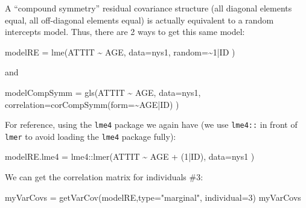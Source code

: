 \documentclass[
  letterpaper,
  DIV=11,
  numbers=noendperiod]{scrreprt}
\newenvironment{Shaded}{}{}
\newcommand{\AttributeTok}[1]{\textcolor[rgb]{0.49,0.56,0.16}{#1}}
\newcommand{\DecValTok}[1]{\textcolor[rgb]{0.25,0.63,0.44}{#1}}
\newcommand{\FunctionTok}[1]{\textcolor[rgb]{0.02,0.16,0.49}{#1}}
\newcommand{\NormalTok}[1]{#1}
\newcommand{\OtherTok}[1]{\textcolor[rgb]{0.00,0.44,0.13}{#1}}
\newcommand{\SpecialCharTok}[1]{\textcolor[rgb]{0.25,0.44,0.63}{#1}}
\newcommand{\StringTok}[1]{\textcolor[rgb]{0.25,0.44,0.63}{#1}}
\begin{document}
A ``compound symmetry'' residual covariance structure (all diagonal
elements equal, all off-diagonal elements equal) is actually equivalent
to a random intercepts model. Thus, there are 2 ways to get this same
model:

\begin{Shaded}
\begin{Highlighting}[]
\NormalTok{modelRE }\OtherTok{=} \FunctionTok{lme}\NormalTok{(ATTIT }\SpecialCharTok{\textasciitilde{}}\NormalTok{ AGE, }
              \AttributeTok{data=}\NormalTok{nys1,}
              \AttributeTok{random=}\SpecialCharTok{\textasciitilde{}}\DecValTok{1}\SpecialCharTok{|}\NormalTok{ID )}
\end{Highlighting}
\end{Shaded}

and

\begin{Shaded}
\begin{Highlighting}[]
\NormalTok{modelCompSymm }\OtherTok{=} \FunctionTok{gls}\NormalTok{(ATTIT }\SpecialCharTok{\textasciitilde{}}\NormalTok{ AGE,}
                    \AttributeTok{data=}\NormalTok{nys1,}
                    \AttributeTok{correlation=}\FunctionTok{corCompSymm}\NormalTok{(}\AttributeTok{form=}\SpecialCharTok{\textasciitilde{}}\NormalTok{AGE}\SpecialCharTok{|}\NormalTok{ID) )}
\end{Highlighting}
\end{Shaded}

For reference, using the \texttt{lme4} package we again have (we use
\texttt{lme4::} in front of \texttt{lmer} to avoid loading the
\texttt{lme4} package fully):

\begin{Shaded}
\begin{Highlighting}[]
\NormalTok{modelRE.lme4 }\OtherTok{=}\NormalTok{ lme4}\SpecialCharTok{::}\FunctionTok{lmer}\NormalTok{(ATTIT }\SpecialCharTok{\textasciitilde{}}\NormalTok{ AGE }\SpecialCharTok{+}\NormalTok{ (}\DecValTok{1}\SpecialCharTok{|}\NormalTok{ID), }\AttributeTok{data=}\NormalTok{nys1 )}
\end{Highlighting}
\end{Shaded}

We can get the correlation matrix for individuals \#3:

\begin{Shaded}
\begin{Highlighting}[]
\NormalTok{myVarCovs }\OtherTok{=} \FunctionTok{getVarCov}\NormalTok{(modelRE,}\AttributeTok{type=}\StringTok{"marginal"}\NormalTok{, }\AttributeTok{individual=}\DecValTok{3}\NormalTok{)}
\NormalTok{myVarCovs}
\end{Highlighting}
\end{Shaded}
\end{document}
